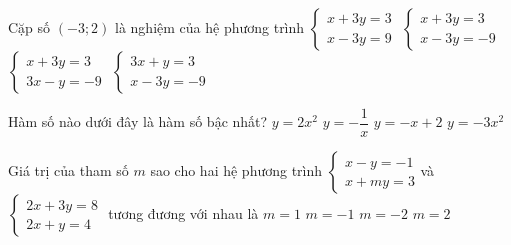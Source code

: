 \begin{ex}%
Cặp số $(-3;2)$ là nghiệm của hệ phương trình
\choice
{$\begin{cases}x+3y=3\\ x-3y=9\end{cases}$}
{\True $\begin{cases}x+3y=3\\ x-3y=-9\end{cases}$}
{$\begin{cases}x+3y=3\\ 3x-y=-9\end{cases}$}
{$\begin{cases}3x+y=3\\ x-3y=-9\end{cases}$}
\end{ex}
\begin{ex}%
Hàm số nào dưới đây là hàm số bậc nhất?
\choice
{$y=2x^2$}
{$y=-\dfrac{1}{x}$}
{\True $y=-x+2$}
{$y=-3x^2$}
\end{ex}
\begin{ex}%
Giá trị của tham số $m$ sao cho hai hệ phương trình $\begin{cases}x-y=-1\\x+my=3\end{cases}$và $\begin{cases}2x+3y=8\\2x+y=4\end{cases}$ tương đương với nhau là
\choice
{\True $m=1$}
{$m=-1$}
{$m=-2$}
{$m=2$}
\end{ex}
